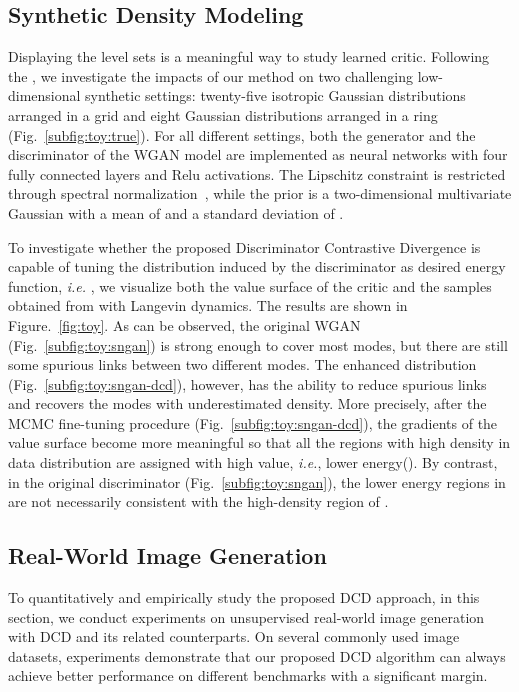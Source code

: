 \documentclass{article}
\begin{document}
\subsection{Synthetic Density Modeling}
Displaying the level sets is a meaningful way to study learned critic. Following the \cite{azadi2018discriminator,gulrajani2017improved}, we investigate the impacts of our method on two challenging low-dimensional synthetic settings: twenty-five isotropic Gaussian distributions arranged in a grid and eight Gaussian distributions arranged in a ring (Fig.~\ref{subfig:toy:true}). For all different settings, both the generator and the discriminator of the WGAN model are implemented as neural networks with four fully connected layers and Relu activations. The Lipschitz constraint is restricted through spectral normalization~\cite{miyato2018spectral}, while the prior is a two-dimensional multivariate Gaussian with a mean of  and a standard deviation of .


To investigate whether the proposed Discriminator Contrastive Divergence is capable of tuning the distribution induced by the discriminator as desired energy function, \emph{i.e.} , we visualize both the value surface of the critic and the samples obtained from  with Langevin dynamics. The results are shown in Figure.~\ref{fig:toy}. As can be observed, the original WGAN (Fig.~\ref{subfig:toy:sngan}) is strong enough to cover most modes, but there are still some spurious links between two different modes. The enhanced distribution  (Fig.~\ref{subfig:toy:sngan-dcd}), however, has the ability to reduce spurious links and recovers the modes with underestimated density. More precisely, after the MCMC fine-tuning procedure (Fig.~\ref{subfig:toy:sngan-dcd}), the gradients of the value surface become more meaningful so that all the regions with high density in data distribution  are assigned with high  value, \emph{i.e.}, lower energy(). By contrast, in the original discriminator (Fig.~\ref{subfig:toy:sngan}), the lower energy regions in  are not necessarily consistent with the high-density region of .

\subsection{Real-World Image Generation}

To quantitatively and empirically study the proposed DCD approach, in this section, we conduct experiments on unsupervised real-world image generation with DCD and its related counterparts. On several commonly used image datasets, experiments demonstrate that our proposed DCD algorithm can always achieve better performance on different benchmarks with a significant margin.
\end{document}
